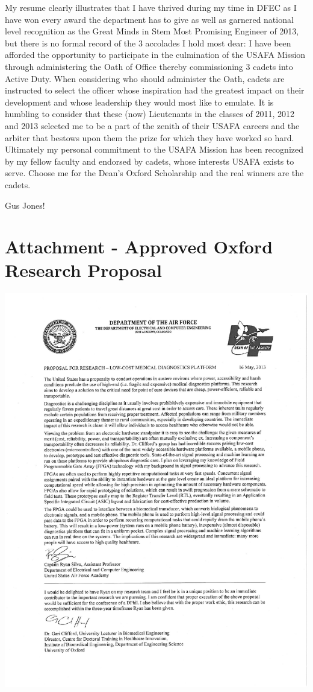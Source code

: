 \documentclass{article}
\begin{document}
My resume clearly illustrates that I have thrived during my time in DFEC as I
have won every award the department has to give as well as garnered national
level recognition as the Great Minds in Stem Most Promising Engineer of 2013,
but there is no formal record of the 3 accolades I hold most dear: I have been
afforded the opportunity to participate in the culmination of the USAFA Mission
through administering the Oath of Office thereby commissioning 3 cadets into
Active Duty. When considering who should administer the Oath, cadets are
instructed to select the officer whose inspiration had the greatest impact on
their development and whose leadership they would most like to emulate. It is
humbling to consider that these (now) Lieutenants in the classes of 2011, 2012
and 2013 selected me to be a part of the zenith of their USAFA careers and the
arbiter that bestows upon them the prize for which they have worked so hard.
Ultimately my personal commitment to the USAFA Mission has been recognized by
my fellow faculty and endorsed by cadets, whose interests USAFA exists to
serve. Choose me for the Dean's
Oxford Scholarship and the real winners are the cadets.

Gus Jones!

\newpage
\section{Attachment - Approved Oxford Research Proposal}
\label{sec:prop}
\centering
\includegraphics[scale=.85,clip=true,trim=1in .5in 1cm 0.4in]{MFR_ProposalforResearch_SilvaSIGNED.pdf}

%
\end{document}
